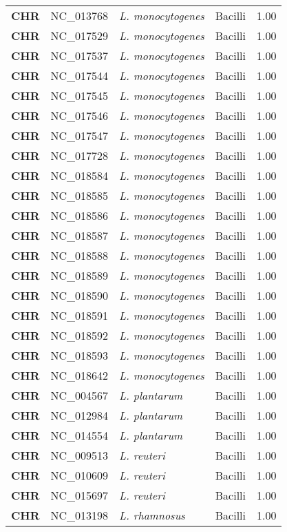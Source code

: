 \begin{adjustwidth}{-3cm}{2cm}
{\begin{supertabular}{>{\bfseries}l|p{0.1\textwidth}p{0.14\textwidth}l|l}
CHR & NC\_013768 & \textit{L. monocytogenes} & Bacilli & 1.00\\
CHR & NC\_017529 & \textit{L. monocytogenes} & Bacilli & 1.00\\
CHR & NC\_017537 & \textit{L. monocytogenes} & Bacilli & 1.00\\
CHR & NC\_017544 & \textit{L. monocytogenes} & Bacilli & 1.00\\
CHR & NC\_017545 & \textit{L. monocytogenes} & Bacilli & 1.00\\
CHR & NC\_017546 & \textit{L. monocytogenes} & Bacilli & 1.00\\
CHR & NC\_017547 & \textit{L. monocytogenes} & Bacilli & 1.00\\
CHR & NC\_017728 & \textit{L. monocytogenes} & Bacilli & 1.00\\
CHR & NC\_018584 & \textit{L. monocytogenes} & Bacilli & 1.00\\
CHR & NC\_018585 & \textit{L. monocytogenes} & Bacilli & 1.00\\
CHR & NC\_018586 & \textit{L. monocytogenes} & Bacilli & 1.00\\
CHR & NC\_018587 & \textit{L. monocytogenes} & Bacilli & 1.00\\
CHR & NC\_018588 & \textit{L. monocytogenes} & Bacilli & 1.00\\
CHR & NC\_018589 & \textit{L. monocytogenes} & Bacilli & 1.00\\
CHR & NC\_018590 & \textit{L. monocytogenes} & Bacilli & 1.00\\
CHR & NC\_018591 & \textit{L. monocytogenes} & Bacilli & 1.00\\
CHR & NC\_018592 & \textit{L. monocytogenes} & Bacilli & 1.00\\
CHR & NC\_018593 & \textit{L. monocytogenes} & Bacilli & 1.00\\
CHR & NC\_018642 & \textit{L. monocytogenes} & Bacilli & 1.00\\
CHR & NC\_004567 & \textit{L. plantarum} & Bacilli & 1.00\\
CHR & NC\_012984 & \textit{L. plantarum} & Bacilli & 1.00\\
CHR & NC\_014554 & \textit{L. plantarum} & Bacilli & 1.00\\
CHR & NC\_009513 & \textit{L. reuteri} & Bacilli & 1.00\\
CHR & NC\_010609 & \textit{L. reuteri} & Bacilli & 1.00\\
CHR & NC\_015697 & \textit{L. reuteri} & Bacilli & 1.00\\
CHR & NC\_013198 & \textit{L. rhamnosus} & Bacilli & 1.00\\

\end{supertabular}}
\end{adjustwidth}
